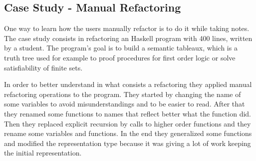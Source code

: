


\subsection{Case Study - Manual Refactoring}

One way to learn how the users manually refactor is to do it while taking notes.
The case study \cite{thompson2003case} consists in refactoring an Haskell program with 400 lines, written by a student.
The program's goal is to build a semantic tableaux, which is a truth tree used for example to proof procedures for first order logic or solve satisfiability of finite sets.

In order to better understand in what consists a refactoring they applied manual refactoring operations to the program.
They started by changing the name of some variables to avoid misunderstandings and to be easier to read.
After that they renamed some functions to names that reflect better what the function did.
Then they replaced explicit recursion by calls to higher order functions and they rename some variables and functions.
In the end they generalized some functions and modified the representation type because it was giving a lot of work keeping the initial representation.

